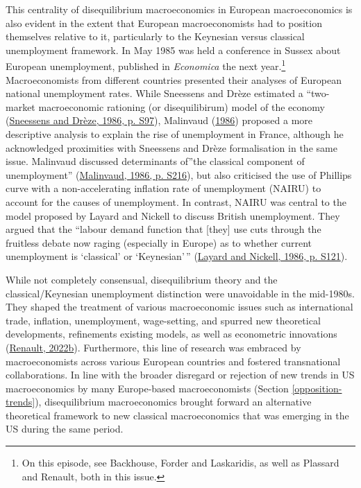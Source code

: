 \documentclass[
  12pt,
  onecolumn]{article}
\begin{document}
This centrality of disequilibrium macroeconomics in European
macroeconomics is also evident in the extent that European
macroeconomists had to position themselves relative to it, particularly
to the Keynesian versus classical unemployment framework. In May 1985
was held a conference in Sussex about European unemployment, published
in \emph{Economica} the next year.\footnote{On this episode, see
  Backhouse, Forder and Laskaridis, as well as Plassard and Renault,
  both in this issue.} Macroeconomists from different countries
presented their analyses of European national unemployment rates. While
Sneessens and Drèze estimated a ``two-market macroeconomic rationing (or
disequilibirum) model of the economy
(\protect\hyperlink{ref-sneessens1986}{Sneessens and Drèze, 1986, p.
S97}), Malinvaud (\protect\hyperlink{ref-malinvaud1986}{1986}) proposed
a more descriptive analysis to explain the rise of unemployment in
France, although he acknowledged proximities with Sneessens and Drèze
formalisation in the same issue. Malinvaud discussed determinants
of''the classical component of unemployment''
(\protect\hyperlink{ref-malinvaud1986}{Malinvaud, 1986, p. S216}), but
also criticised the use of Phillips curve with a non-accelerating
inflation rate of unemployment (NAIRU) to account for the causes of
unemployment. In contrast, NAIRU was central to the model proposed by
Layard and Nickell to discuss British unemployment. They argued that the
``labour demand function that {[}they{]} use cuts through the fruitless
debate now raging (especially in Europe) as to whether current
unemployment is `classical' or `Keynesian'\,''
(\protect\hyperlink{ref-layard1986}{Layard and Nickell, 1986, p. S121}).

While not completely consensual, disequilibrium theory and the
classical/Keynesian unemployment distinction were unavoidable in the
mid-1980s. They shaped the treatment of various macroeconomic issues
such as international trade, inflation, unemployment, wage-setting, and
spurred new theoretical developments, refinements existing models, as
well as econometric innovations
(\protect\hyperlink{ref-renault2019}{Renault, 2022b}). Furthermore, this
line of research was embraced by macroeconomists across various European
countries and fostered transnational collaborations. In line with the
broader disregard or rejection of new trends in US macroeconomics by
many Europe-based macroeconomists (Section \ref{opposition-trends}),
disequilibrium macroeconomics brought forward an alternative theoretical
framework to new classical macroeconomics that was emerging in the US
during the same period.
\end{document}
